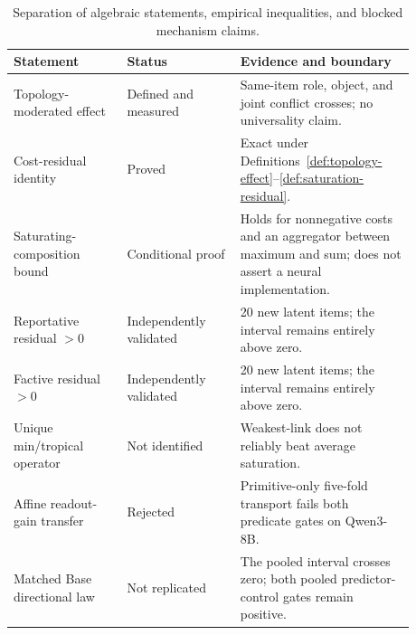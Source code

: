 \begin{table}[H]
\centering
\small
\begin{tabular}{p{0.25\linewidth}p{0.25\linewidth}p{0.38\linewidth}}
\toprule
Statement & Status & Evidence and boundary \\
\midrule
Topology-moderated effect & Defined and measured & Same-item role, object, and joint conflict crosses; no universality claim. \\
Cost-residual identity & Proved & Exact under Definitions~\ref{def:topology-effect}--\ref{def:saturation-residual}. \\
Saturating-composition bound & Conditional proof & Holds for nonnegative costs and an aggregator between maximum and sum; does not assert a neural implementation. \\
Reportative residual $>0$ & Independently validated & 20 new latent items; the interval remains entirely above zero. \\
Factive residual $>0$ & Independently validated & 20 new latent items; the interval remains entirely above zero. \\
Unique min/tropical operator & Not identified & Weakest-link does not reliably beat average saturation. \\
Affine readout-gain transfer & Rejected & Primitive-only five-fold transport fails both predicate gates on Qwen3-8B. \\
Matched Base directional law & Not replicated & The pooled interval crosses zero; both pooled predictor-control gates remain positive. \\
\bottomrule
\end{tabular}
\vspace{4pt}
\caption{Separation of algebraic statements, empirical inequalities, and blocked mechanism claims.}
\label{tab:theorem-evidence}
\end{table}
